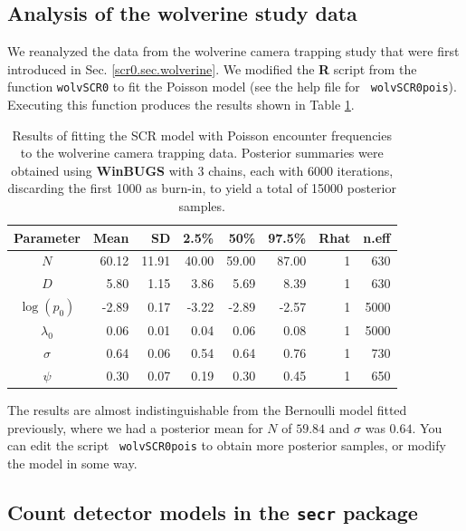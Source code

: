 \subsection{Analysis of the wolverine study data}

We reanalyzed the data from the wolverine camera trapping study that
were first introduced in Sec. \ref{scr0.sec.wolverine}.  We modified
the {\bf R} script from the function \mbox{\tt wolvSCR0} to fit the
Poisson model (see the help file for \mbox{\tt
  wolvSCR0pois}). Executing this function produces the results shown
in Table \ref{poisson-mn.tab.wolverine}.
\begin{table}
\centering
\caption{Results of fitting the SCR model with Poisson encounter
  frequencies to the wolverine camera trapping data.
Posterior summaries were obtained using {\bf WinBUGS} with
 3 chains, each with 6000 iterations, discarding the first 1000 as
 burn-in, to yield a total of 15000 posterior samples.
}
\begin{tabular}{crrrrrrr} \hline \hline
 Parameter & Mean &  SD & 2.5\% & 50\%  & 97.5\% &Rhat& n.eff \\ \hline
$N$        & 60.12&11.91& 40.00& 59.00& 87.00& 1&   630\\
$D$        &  5.80& 1.15& 3.86 & 5.69 & 8.39 & 1&   630\\ 
$\log(p_0)$  &-2.89& 0.17& -3.22& -2.89& -2.57& 1&  5000\\
$\lambda_{0}$& 0.06& 0.01& 0.04 &  0.06 & 0.08& 1&  5000\\
$\sigma$   &  0.64& 0.06& 0.54 &  0.64 & 0.76& 1 &  730 \\
$\psi$     &  0.30& 0.07& 0.19 &  0.30 & 0.45& 1 &  650 \\ \hline
\end{tabular}
\label{poisson-mn.tab.wolverine}
\end{table}
The results are almost indistinguishable from the Bernoulli model
fitted previously, where we had a posterior mean for $N$ of $59.84$
and $\sigma$ was $0.64$.  You can edit the script \mbox{\tt
  wolvSCR0pois} to obtain more posterior samples, or modify the model
in some way.


\subsection{Count detector models in the  \mbox{\tt secr} package}

